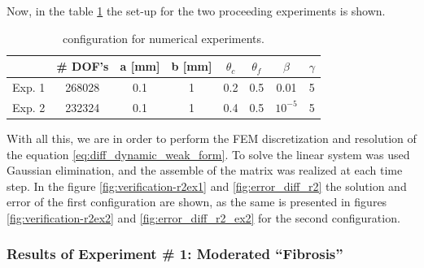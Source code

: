 Now, in the table \ref{fig:exp_r2_setup} the set-up for the two proceeding experiments is shown.

\begin{table}[H]
\centering
\label{tab:geometric_setup_diff_r2}
\begin{tabular}{@{}cccccccc@{}}
\toprule
       & \# DOF's & a {[}mm{]} & b {[}mm{]} & $\theta_c$ & $\theta_f$ & $\beta$   & $\gamma$ \\ \midrule
Exp. 1 & 268028   & 0.1        & 1          & 0.2        & 0.5        & 0.01      & 5        \\
Exp. 2 & 232324   & 0.1        & 1          & 0.4        & 0.5        & $10^{-5}$ & 5        \\ \bottomrule
\end{tabular}
\caption{configuration for numerical experiments.} \label{fig:exp_r2_setup}
\end{table}

With all this, we are in order to perform the FEM discretization and resolution of the equation \ref{eq:diff_dynamic_weak_form}. To solve the linear system was used Gaussian elimination, and the assemble of the matrix was realized at each time step. In the figure \ref{fig:verification-r2ex1} and \ref{fig:error_diff_r2} the solution and error of the first configuration are shown, as the same is presented in figures \ref{fig:verification-r2ex2} and \ref{fig:error_diff_r2_ex2} for the second configuration.

\subsubsection*{Results of Experiment \# 1: Moderated ``Fibrosis''}

